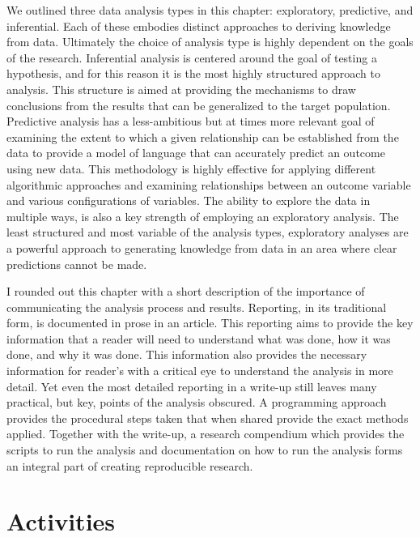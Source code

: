 \documentclass[
  letterpaper,
  DIV=11,
  numbers=noendperiod]{scrreport}
\theoremstyle{definition}
\theoremstyle{remark}
\begin{document}
We outlined three data analysis types in this chapter: exploratory,
predictive, and inferential. Each of these embodies distinct approaches
to deriving knowledge from data. Ultimately the choice of analysis type
is highly dependent on the goals of the research. Inferential analysis
is centered around the goal of testing a hypothesis, and for this reason
it is the most highly structured approach to analysis. This structure is
aimed at providing the mechanisms to draw conclusions from the results
that can be generalized to the target population. Predictive analysis
has a less-ambitious but at times more relevant goal of examining the
extent to which a given relationship can be established from the data to
provide a model of language that can accurately predict an outcome using
new data. This methodology is highly effective for applying different
algorithmic approaches and examining relationships between an outcome
variable and various configurations of variables. The ability to explore
the data in multiple ways, is also a key strength of employing an
exploratory analysis. The least structured and most variable of the
analysis types, exploratory analyses are a powerful approach to
generating knowledge from data in an area where clear predictions cannot
be made.

I rounded out this chapter with a short description of the importance of
communicating the analysis process and results. Reporting, in its
traditional form, is documented in prose in an article. This reporting
aims to provide the key information that a reader will need to
understand what was done, how it was done, and why it was done. This
information also provides the necessary information for reader's with a
critical eye to understand the analysis in more detail. Yet even the
most detailed reporting in a write-up still leaves many practical, but
key, points of the analysis obscured. A programming approach provides
the procedural steps taken that when shared provide the exact methods
applied. Together with the write-up, a research compendium which
provides the scripts to run the analysis and documentation on how to run
the analysis forms an integral part of creating reproducible research.

\hypertarget{activities-1}{%
\section*{Activities}\label{activities-1}}

\end{document}
